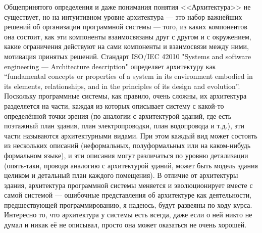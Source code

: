 \documentclass[a5paper]{article}
\begin{document}
Общепринятого определения и даже понимания понятия <<Архитектура>> не существует, но на интуитивном уровне архитектура --- это набор важнейших решений об организации программной системы --- того, из каких компонентов она состоит, как эти компоненты взаимосвязаны друг с другом и с окружением, какие ограничения действуют на сами компоненты и взаимосвязи между ними, мотивация принятых решений. Стандарт ISO/IEC 42010 "Systems and software engineering --- Architecture description" определяет архитектуру как ``fundamental concepts or properties of a system in its environment embodied in its elements, relationships, and in the principles of its design and evolution''. Поскольку программные системы, как правило, очень сложны, их архитектура разделяется на части, каждая из которых описывает систему с какой-то определённой точки зрения (по аналогии с архитектурой зданий, где есть поэтажный план здания, план электропроводки, план водопровода и т.д.), эти части называются архитектурными видами. При этом каждый вид может состоять из нескольких описаний (неформальных, полуформальных или на каком-нибудь формальном языке), и эти описания могут различаться по уровню детализации (опять-таки, проводя аналогию с архитектурой зданий, может быть модель здания целиком и детальный план каждого помещения). В отличие от архитектуры здания, архитектура программной системы меняется и эволюционирует вместе с самой системой --- ошибочные представления об архитектуре как деятельности, предшествующей программированию, я надеюсь, будут развеяны по ходу курса. Интересно то, что архитектура у системы есть всегда, даже если о ней никто не думал и никак её не описывал, просто она может оказаться не очень хорошей.
\end{document}
